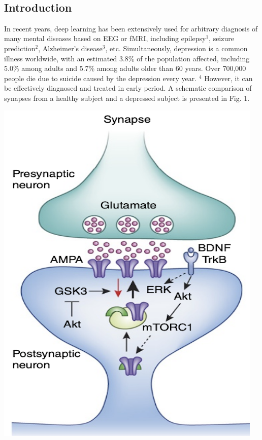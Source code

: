 \documentclass[a0,portrait]{a0poster}
\begin{document}
\begin{minipage}[c]{\linewidth}
{\begin{minipage}[c]{0.15\textwidth}
\hspace{1cm}
\end{minipage}}
\\[0.1cm]%
\color{Orange}\setlength\FrameRule{10pt}
\begin{framed}
\vspace{0.5cm}
\begin{multicols}{2} %
\color{Black}
\section*{Introduction}
In recent years, deep learning has been extensively used for arbitrary diagnosis of many mental diseases based on EEG or fMRI, including epilepsy$^1$, seizure prediction$^2$, Alzheimer's disease$^3$, etc. Simultaneously, depression is a common illness worldwide, with an estimated 3.8\% of the population affected, including 5.0\% among adults and 5.7\% among adults older than 60 years. Over 700,000 people die due to suicide caused by the depression every year. $^4$  However, it can be effectively diagnosed and treated in early period. A schematic comparison of synapses from a healthy subject and a depressed subject is presented in Fig. 1.\\
\begin{center}
\hspace*{\fill}
\includegraphics[width=0.4\linewidth]{figures/normal_syn}

\end{center}
\end{multicols}
\end{framed}
\end{minipage}
\end{document}
